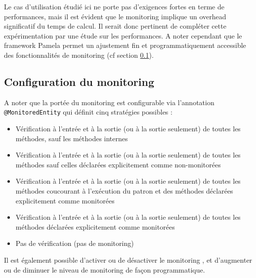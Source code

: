 Le cas d'utilisation étudié ici ne porte pas d'exigences fortes en terme de performances, mais il est évident que le monitoring implique un overhead significatif du temps de calcul. Il serait donc pertinent de compléter cette expérimentation par une étude sur les performances. A noter cependant que le framework Pamela permet un ajustement fin et programmatiquement accessible des fonctionnalités de monitoring (cf section \ref{subsec:conf-monitoring}).


\subsection{Configuration du monitoring}
\label{subsec:conf-monitoring}


A noter que la portée du monitoring est configurable via l'annotation \texttt{@MonitoredEntity} qui définit cinq stratégies possibles :
\begin{itemize}
    \item Vérification à l'entrée et à la sortie (ou à la sortie seulement) de toutes les méthodes, sauf les méthodes internes
    \item Vérification à l'entrée et à la sortie (ou à la sortie seulement) de toutes les méthodes sauf celles déclarées explicitement comme non-monitorées
    \item Vérification à l'entrée et à la sortie (ou à la sortie seulement) de toutes les méthodes coucourant à l'exécution du patron et des méthodes déclarées explicitement comme monitorées
    \item Vérification à l'entrée et à la sortie (ou à la sortie seulement) de toutes les méthodes déclarées explicitement comme monitorées
    \item Pas de vérification (pas de monitoring)
\end{itemize}
Il est également possible d'activer ou de désactiver le monitoring , et d'augmenter ou de diminuer le niveau de monitoring de façon programmatique.
